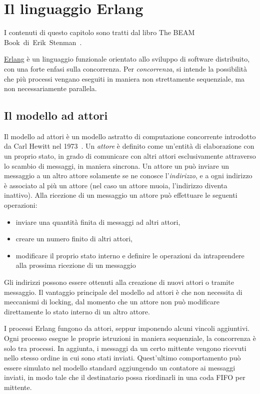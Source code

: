 \documentclass[target=bach,aauheader=,style=]{thud}
\newcommand{\eng}[1]{\foreignlanguage{english}{#1}}
\begin{document}
\chapter{Il linguaggio Erlang}

I contenuti di questo capitolo sono tratti dal libro \eng{The BEAM Book}~di~Erik~Stenman~\cite{Stenman_2017}.
\bigskip

\href{https://www.erlang.org/}{Erlang} è un linguaggio funzionale orientato allo sviluppo di software distribuito, con una forte enfasi sulla concorrenza. Per \emph{concorrenza}, si intende la possibilità che più processi vengano eseguiti in maniera non strettamente sequenziale, ma non necessariamente parallela.

\section{Il modello ad attori}
Il modello ad attori è un modello astratto di computazione concorrente introdotto da Carl Hewitt nel 1973~\cite{10.5555/1624775.1624804}. Un \emph{attore} è definito come un'entità di elaborazione con un proprio stato, in grado di comunicare con altri attori esclusivamente attraverso lo scambio di messaggi, in maniera sincrona. Un attore un può inviare un messaggio a un altro attore solamente se ne conosce l'\emph{indirizzo}, e a ogni indirizzo è associato al più un attore (nel caso un attore muoia, l'indirizzo diventa inattivo). Alla ricezione di un messaggio un attore può effettuare le seguenti operazioni:
\begin{itemize}
    \item inviare una quantità finita di messaggi ad altri attori,
    \item creare un numero finito di altri attori,
    \item modificare il proprio stato interno e definire le operazioni da intraprendere alla prossima ricezione di un messaggio
\end{itemize}
Gli indirizzi possono essere ottenuti alla creazione di nuovi attori o tramite messaggio. Il vantaggio principale del modello ad attori è che non necessita di meccanismi di \eng{locking}, dal momento che un attore non può modificare direttamente lo stato interno di un altro attore.

I processi Erlang fungono da attori, seppur imponendo alcuni vincoli aggiuntivi. Ogni processo esegue le proprie istruzioni in maniera sequenziale, la concorrenza è solo tra processi. In aggiunta, i messaggi da un certo mittente vengono ricevuti nello stesso ordine in cui sono stati inviati. Quest'ultimo comportamento può essere simulato nel modello standard aggiungendo un contatore ai messaggi inviati, in modo tale che il destinatario possa riordinarli in una coda FIFO per mittente.
\end{document}
